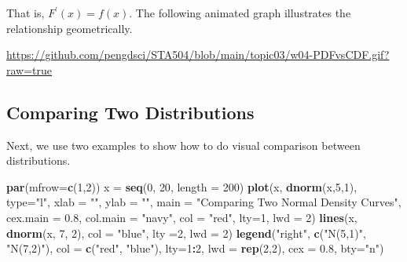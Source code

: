 \documentclass[
]{book}
\newenvironment{Shaded}{\begin{snugshade}}{\end{snugshade}}
\newcommand{\AttributeTok}[1]{\textcolor[rgb]{0.13,0.29,0.53}{#1}}
\newcommand{\DecValTok}[1]{\textcolor[rgb]{0.00,0.00,0.81}{#1}}
\newcommand{\FloatTok}[1]{\textcolor[rgb]{0.00,0.00,0.81}{#1}}
\newcommand{\FunctionTok}[1]{\textcolor[rgb]{0.13,0.29,0.53}{\textbf{#1}}}
\newcommand{\NormalTok}[1]{#1}
\newcommand{\OtherTok}[1]{\textcolor[rgb]{0.56,0.35,0.01}{#1}}
\newcommand{\SpecialCharTok}[1]{\textcolor[rgb]{0.81,0.36,0.00}{\textbf{#1}}}
\newcommand{\StringTok}[1]{\textcolor[rgb]{0.31,0.60,0.02}{#1}}
\begin{document}
That is, \(F^{\prime}(x) = f(x)\). The following animated graph illustrates the relationship geometrically.

\url{https://github.com/pengdsci/STA504/blob/main/topic03/w04-PDFvsCDF.gif?raw=true}

\hypertarget{comparing-two-distributions}{%
\subsection{Comparing Two Distributions}\label{comparing-two-distributions}}

Next, we use two examples to show how to do visual comparison between distributions.

\begin{Shaded}
\begin{Highlighting}[]
\FunctionTok{par}\NormalTok{(}\AttributeTok{mfrow=}\FunctionTok{c}\NormalTok{(}\DecValTok{1}\NormalTok{,}\DecValTok{2}\NormalTok{))}
\NormalTok{x }\OtherTok{=} \FunctionTok{seq}\NormalTok{(}\DecValTok{0}\NormalTok{, }\DecValTok{20}\NormalTok{, }\AttributeTok{length =} \DecValTok{200}\NormalTok{)}
\FunctionTok{plot}\NormalTok{(x, }\FunctionTok{dnorm}\NormalTok{(x,}\DecValTok{5}\NormalTok{,}\DecValTok{1}\NormalTok{), }\AttributeTok{type=}\StringTok{"l"}\NormalTok{, }\AttributeTok{xlab =} \StringTok{""}\NormalTok{, }\AttributeTok{ylab =} \StringTok{""}\NormalTok{,}
        \AttributeTok{main =} \StringTok{"Comparing Two Normal Density Curves"}\NormalTok{,}
        \AttributeTok{cex.main =} \FloatTok{0.8}\NormalTok{, }\AttributeTok{col.main =} \StringTok{"navy"}\NormalTok{, }\AttributeTok{col =} \StringTok{"red"}\NormalTok{, }\AttributeTok{lty=}\DecValTok{1}\NormalTok{, }\AttributeTok{lwd =} \DecValTok{2}\NormalTok{)}
\FunctionTok{lines}\NormalTok{(x, }\FunctionTok{dnorm}\NormalTok{(x, }\DecValTok{7}\NormalTok{, }\DecValTok{2}\NormalTok{), }\AttributeTok{col =} \StringTok{"blue"}\NormalTok{, }\AttributeTok{lty =}\DecValTok{2}\NormalTok{, }\AttributeTok{lwd =} \DecValTok{2}\NormalTok{)}
\FunctionTok{legend}\NormalTok{(}\StringTok{"right"}\NormalTok{, }\FunctionTok{c}\NormalTok{(}\StringTok{"N(5,1)"}\NormalTok{, }\StringTok{"N(7,2)"}\NormalTok{), }\AttributeTok{col =} \FunctionTok{c}\NormalTok{(}\StringTok{"red"}\NormalTok{, }\StringTok{"blue"}\NormalTok{), }\AttributeTok{lty=}\DecValTok{1}\SpecialCharTok{:}\DecValTok{2}\NormalTok{, }
                   \AttributeTok{lwd =} \FunctionTok{rep}\NormalTok{(}\DecValTok{2}\NormalTok{,}\DecValTok{2}\NormalTok{), }\AttributeTok{cex =} \FloatTok{0.8}\NormalTok{, }\AttributeTok{bty=}\StringTok{"n"}\NormalTok{)}

\end{Highlighting}
\end{Shaded}
\end{document}
